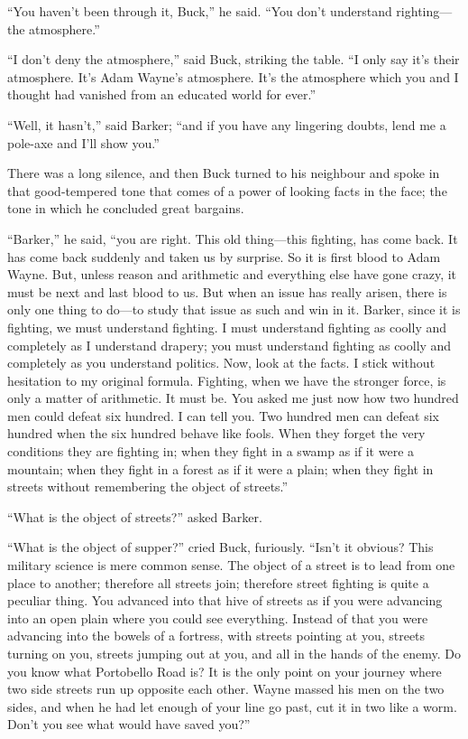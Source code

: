 \documentclass{book}
\begin{document}
“You haven’t been through it, Buck,” he said. “You don’t understand righting—the atmosphere.”

“I don’t deny the atmosphere,” said Buck, striking the table. “I only say it’s their atmosphere. It’s Adam Wayne’s atmosphere. It’s the atmosphere which you and I thought had vanished from an educated world for ever.”

“Well, it hasn’t,” said Barker; “and if you have any lingering doubts, lend me a pole-axe and I’ll show you.”

There was a long silence, and then Buck turned to his neighbour and spoke in that good-tempered tone that comes of a power of looking facts in the face; the tone in which he concluded great bargains.

“Barker,” he said, “you are right. This old thing—this fighting, has come back. It has come back suddenly and taken us by surprise. So it is first blood to Adam Wayne. But, unless reason and arithmetic and everything else have gone crazy, it must be next and last blood to us. But when an issue has really arisen, there is only one thing to do—to study that issue as such and win in it. Barker, since it is fighting, we must understand fighting. I must understand fighting as coolly and completely as I understand drapery; you must understand fighting as coolly and completely as you understand politics. Now, look at the facts. I stick without hesitation to my original formula. Fighting, when we have the stronger force, is only a matter of arithmetic. It must be. You asked me just now how two hundred men could defeat six hundred. I can tell you. Two hundred men can defeat six hundred when the six hundred behave like fools. When they forget the very conditions they are fighting in; when they fight in a swamp as if it were a mountain; when they fight in a forest as if it were a plain; when they fight in streets without remembering the object of streets.”

“What is the object of streets?” asked Barker.

“What is the object of supper?” cried Buck, furiously. “Isn’t it obvious? This military science is mere common sense. The object of a street is to lead from one place to another; therefore all streets join; therefore street fighting is quite a peculiar thing. You advanced into that hive of streets as if you were advancing into an open plain where you could see everything. Instead of that you were advancing into the bowels of a fortress, with streets pointing at you, streets turning on you, streets jumping out at you, and all in the hands of the enemy. Do you know what Portobello Road is? It is the only point on your journey where two side streets run up opposite each other. Wayne massed his men on the two sides, and when he had let enough of your line go past, cut it in two like a worm. Don’t you see what would have saved you?”
\end{document}
